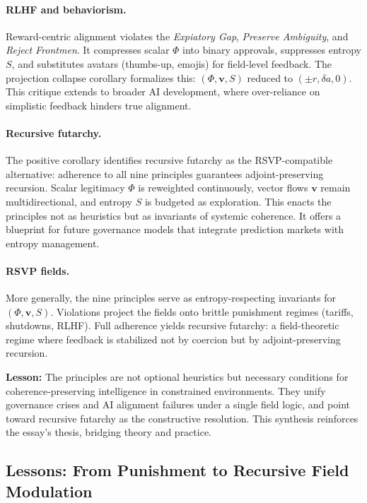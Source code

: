 \documentclass{article}
\begin{document}
\paragraph{RLHF and behaviorism.} Reward-centric alignment violates the 
\emph{Expiatory Gap}, \emph{Preserve Ambiguity}, and \emph{Reject Frontmen}. 
It compresses scalar $\Phi$ into binary approvals, suppresses entropy $S$, 
and substitutes avatars (thumbs-up, emojis) for field-level feedback. The 
projection collapse corollary formalizes this: $(\Phi,\mathbf{v},S)$ reduced 
to $(\pm r, \delta a, 0)$. This critique extends to broader AI development, where over-reliance on simplistic feedback hinders true alignment.

\paragraph{Recursive futarchy.} The positive corollary identifies recursive 
futarchy as the RSVP-compatible alternative: adherence to all nine principles 
guarantees adjoint-preserving recursion. Scalar legitimacy $\Phi$ is reweighted 
continuously, vector flows $\mathbf{v}$ remain multidirectional, and entropy 
$S$ is budgeted as exploration. This enacts the principles not as heuristics 
but as invariants of systemic coherence. It offers a blueprint for future governance models that integrate prediction markets with entropy management.

\paragraph{RSVP fields.} More generally, the nine principles serve as 
entropy-respecting invariants for $(\Phi,\mathbf{v},S)$. Violations project 
the fields onto brittle punishment regimes (tariffs, shutdowns, RLHF). Full 
adherence yields recursive futarchy: a field-theoretic regime where feedback 
is stabilized not by coercion but by adjoint-preserving recursion. 

\bigskip
\noindent
\textbf{Lesson:} The principles are not optional heuristics but necessary 
conditions for coherence-preserving intelligence in constrained environments. 
They unify governance crises and AI alignment failures under a single field 
logic, and point toward recursive futarchy as the constructive resolution. This synthesis reinforces the essay's thesis, bridging theory and practice.

\subsection{Lessons: From Punishment to Recursive Field Modulation}
\label{sec:lessons}
\end{document}
